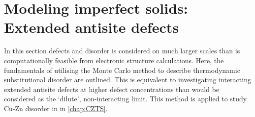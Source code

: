 \documentclass[11pt, twoside]{report}
\begin{document}
\section{Modeling imperfect solids: Extended antisite defects}\label{MC}
In this section defects and disorder is considered on much larger scales than is computationally feasible from electronic structure calculations.
Here, the fundamentals of utilising the Monte Carlo method to describe thermodynamic substitutional disorder are outlined. This is equivalent to investigating interacting extended antisite defects at higher defect concentrations than would be considered as the `dilute', non-interacting limit. This method is applied to study Cu-Zn disorder in {\CZTS} in \autoref{chap:CZTS}.
\end{document}
